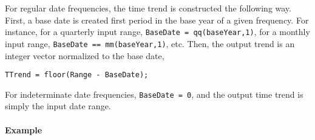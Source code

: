 For regular date frequencies, the time trend is constructed the
following way. First, a base date is created first period in the base
year of a given frequency. For instance, for a quarterly input range,
\texttt{BaseDate = qq(baseYear,1)}, for a monthly input range,
\texttt{BaseDate == mm(baseYear,1)}, etc. Then, the output trend is an
integer vector normalized to the base date,

\begin{verbatim}
TTrend = floor(Range - BaseDate);
\end{verbatim}

For indeterminate date frequencies, \texttt{BaseDate = 0}, and the
output time trend is simply the input date range.

\paragraph{Example}\label{example}


